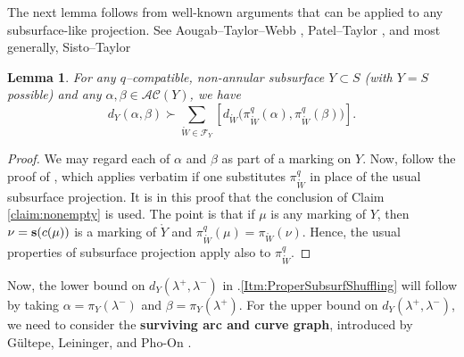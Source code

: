 \documentclass[11pt,letterpaper]{amsart}
\newcommand{\mc}{\mathcal}
\newcommand{\mr}{\mathring}
\newcommand{\psub}{\mr W}
\numberwithin{equation}{section}
\newtheorem{lemma}[theorem]{Lemma}
\theoremstyle{definition}
\newcommand{\define}[1]{\textbf{#1}}
\newcommand{\AC}{\mathcal{AC}}
\begin{document}


The next lemma follows from well-known arguments that can be applied to any subsurface-like projection.
See Aougab--Taylor--Webb \cite[Proposition 4.1]{AougabTaylorWebb}, Patel--Taylor \cite[Proposition 3]{PatelTaylor:EndperiodicLox}, and most generally,  Sisto--Taylor \cite[Proposition 5.1]{SistoTaylor}

\begin{lemma}\label{Lem:ShufflingUpper}
For any $q$--compatible, non-annular subsurface $Y \subset S$ (with $Y = S$ possible) and any $\alpha, \beta \in \AC(Y)$, we have
\[
d_Y(\alpha, \beta) \succ \sum_{\psub \in \mc F_Y} \left[ d_{\psub} \Big( \pi^{q}_{\psub} (\alpha), \pi^{q}_{\psub}(\beta) \Big) \right] .
\]
\end{lemma}

\begin{proof}
We may regard each of $\alpha$ and $\beta$ as part of a marking on $Y$. Now, 
follow the proof of \cite[Proposition 4.1]{AougabTaylorWebb}, which applies verbatim if one substitutes $\pi_{\psub}^q$ in place of the usual subsurface projection. It is in this proof that the conclusion of Claim \ref{claim:nonempty} is used.
The point is that if $\mu$ is any marking of $Y$, then $\nu = {\bf s}(c (\mu))$ is a marking of $\mr Y$ and $\pi_{\psub}^q (\mu) =  \pi_{\psub}(\nu)$. Hence, the usual properties of subsurface projection apply also to $\pi_{\psub}^q$.
\end{proof}

Now, the lower bound on $d_Y(\lambda^+, \lambda^-)$ in .\eqref{Itm:ProperSubsurfShuffling} will follow by taking $\alpha = \pi_Y(\lambda^-)$ and $\beta = \pi_Y(\lambda^+)$. For the upper bound on $d_Y(\lambda^+, \lambda^-)$, we need to consider the \define{surviving arc and curve graph}, introduced by G\"ultepe, Leininger, and Pho-On \cite{GultepeLeiningerPhoOn}. 
\end{document}
